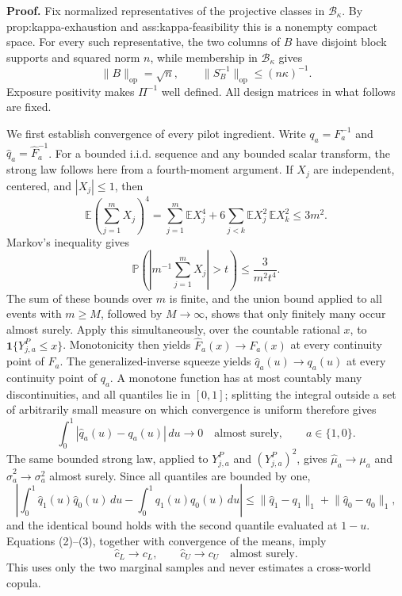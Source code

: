 \textbf{Proof.}
Fix normalized representatives of the projective classes in \(\mathcal B_\kappa\).  By prop:kappa-exhaustion and ass:kappa-feasibility this is a nonempty compact space.  For every such representative, the two columns of \(B\) have disjoint block supports and squared norm \(n\), while membership in \(\mathcal B_\kappa\) gives
\[
\lVert B\rVert_{\mathrm{op}}=\sqrt n,
\qquad
\lVert S_B^{-1}\rVert_{\mathrm{op}}\le (n\kappa)^{-1}.
\tag{1}
\]
Exposure positivity makes \(\Pi^{-1}\) well defined.  All design matrices in what follows are fixed.

We first establish convergence of every pilot ingredient.  Write \(q_a=F_a^{-1}\) and \(\widehat q_a=\widehat F_a^{-1}\).  For a bounded i.i.d. sequence and any bounded scalar transform, the strong law follows here from a fourth-moment argument.  If \(X_j\) are independent, centered, and \(|X_j|\le1\), then
\[
\mathbb E\left(\sum_{j=1}^mX_j\right)^4
=\sum_{j=1}^m\mathbb E X_j^4
+6\sum_{j<k}\mathbb E X_j^2\,\mathbb E X_k^2
\le 3m^2.
\]
Markov's inequality gives
\[
\mathbb P\!\left(\left|m^{-1}\sum_{j=1}^mX_j\right|>t\right)
\le \frac{3}{m^2t^4}.
\]
The sum of these bounds over \(m\) is finite, and the union bound applied to all events with \(m\ge M\), followed by \(M\to\infty\), shows that only finitely many occur almost surely.  Apply this simultaneously, over the countable rational \(x\), to \(\mathbf 1\{Y^P_{j,a}\le x\}\).  Monotonicity then yields \(\widehat F_a(x)\to F_a(x)\) at every continuity point of \(F_a\).  The generalized-inverse squeeze yields \(\widehat q_a(u)\to q_a(u)\) at every continuity point of \(q_a\).  A monotone function has at most countably many discontinuities, and all quantiles lie in \([0,1]\); splitting the integral outside a set of arbitrarily small measure on which convergence is uniform therefore gives
\[
\int_0^1|\widehat q_a(u)-q_a(u)|\,du\longrightarrow0
\quad\text{almost surely},\qquad a\in\{1,0\}.
\tag{2}
\]
The same bounded strong law, applied to \(Y^P_{j,a}\) and \((Y^P_{j,a})^2\), gives \(\widehat\mu_a\to\mu_a\) and \(\widehat\sigma_a^2\to\sigma_a^2\) almost surely.  Since all quantiles are bounded by one,
\[
\left|\int_0^1\widehat q_1(u)\widehat q_0(u)\,du-
\int_0^1q_1(u)q_0(u)\,du\right|
\le\lVert\widehat q_1-q_1\rVert_1+\lVert\widehat q_0-q_0\rVert_1,
\tag{3}
\]
and the identical bound holds with the second quantile evaluated at \(1-u\).  Equations (2)--(3), together with convergence of the means, imply
\[
\widehat c_L\to c_L,
\qquad
\widehat c_U\to c_U
\quad\text{almost surely}.
\tag{4}
\]
This uses only the two marginal samples and never estimates a cross-world copula.

